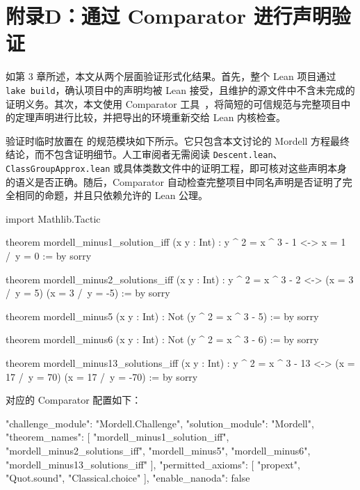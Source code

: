 \newpage
{}
\section*{附录D：通过 Comparator 进行声明验证}
\begingroup
\setlength{\parindent}{0pt}
\setlength{\parskip}{0.35\baselineskip}

如第 3 章所述，本文从两个层面验证形式化结果。首先，整个 Lean 项目通过 \texttt{lake build}，确认项目中的声明均被 Lean 接受，且维护的源文件中不含未完成的证明义务。其次，本文使用 Comparator 工具~\cite{Comparator2026}，将简短的可信规范与完整项目中的定理声明进行比较，并把导出的环境重新交给 Lean 内核检查。

验证时临时放置在  的规范模块如下所示。它只包含本文讨论的 Mordell 方程最终结论，而不包含证明细节。人工审阅者无需阅读 \texttt{Descent.lean}、\texttt{ClassGroupApprox.lean} 或具体类数文件中的证明工程，即可核对这些声明本身的语义是否正确。随后，Comparator 自动检查完整项目中同名声明是否证明了完全相同的命题，并且只依赖允许的 Lean 公理。

\begin{leanlisting}
import Mathlib.Tactic

theorem mordell_minus1_solution_iff (x y : Int) :
    y ^ 2 = x ^ 3 - 1 <-> x = 1 /\ y = 0 := by
  sorry

theorem mordell_minus2_solutions_iff (x y : Int) :
    y ^ 2 = x ^ 3 - 2 <->
      (x = 3 /\ y = 5) \/ (x = 3 /\ y = -5) := by
  sorry

theorem mordell_minus5 (x y : Int) :
    Not (y ^ 2 = x ^ 3 - 5) := by
  sorry

theorem mordell_minus6 (x y : Int) :
    Not (y ^ 2 = x ^ 3 - 6) := by
  sorry

theorem mordell_minus13_solutions_iff (x y : Int) :
    y ^ 2 = x ^ 3 - 13 <->
      (x = 17 /\ y = 70) \/ (x = 17 /\ y = -70) := by
  sorry
\end{leanlisting}

对应的 Comparator 配置如下：

\begin{leanlisting}
{
  "challenge_module": "Mordell.Challenge",
  "solution_module": "Mordell",
  "theorem_names": [
    "mordell_minus1_solution_iff",
    "mordell_minus2_solutions_iff",
    "mordell_minus5",
    "mordell_minus6",
    "mordell_minus13_solutions_iff"
  ],
  "permitted_axioms": [
    "propext",
    "Quot.sound",
    "Classical.choice"
  ],
  "enable_nanoda": false
}
\end{leanlisting}


